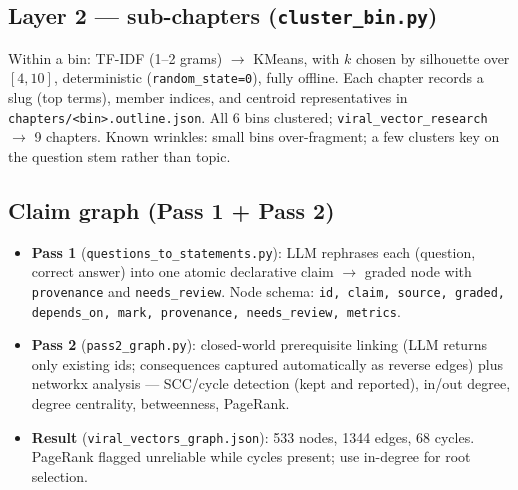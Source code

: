 \documentclass[11pt]{article}
\newcommand{\code}[1]{\texttt{#1}}
\begin{document}
\subsection{Layer 2 --- sub-chapters (\code{cluster\_bin.py})}
Within a bin: TF-IDF (1--2 grams) $\rightarrow$ KMeans, with $k$ chosen by silhouette over
$[4,10]$, deterministic (\code{random\_state=0}), fully offline. Each chapter records a
slug (top terms), member indices, and centroid representatives in
\code{chapters/<bin>.outline.json}. All 6 bins clustered; \code{viral\_vector\_research}
$\rightarrow$ 9 chapters. Known wrinkles: small bins over-fragment; a few clusters key on
the question stem rather than topic.


\subsection{Claim graph (Pass 1 + Pass 2)}
\begin{itemize}
\item \textbf{Pass 1} (\code{questions\_to\_statements.py}): LLM rephrases each (question,
correct answer) into one atomic declarative claim $\rightarrow$ graded node with
\code{provenance} and \code{needs\_review}. Node schema: \code{id, claim, source, graded,
depends\_on, mark, provenance, needs\_review, metrics}.
\item \textbf{Pass 2} (\code{pass2\_graph.py}): closed-world prerequisite linking
(LLM returns only existing ids; consequences captured automatically as reverse edges) plus
networkx analysis --- SCC/cycle detection (kept and reported), in/out degree, degree
centrality, betweenness, PageRank.
\item \textbf{Result} (\code{viral\_vectors\_graph.json}): 533 nodes, 1344 edges, 68
cycles. PageRank flagged unreliable while cycles present; use in-degree for root selection.
\end{itemize}
\end{document}
